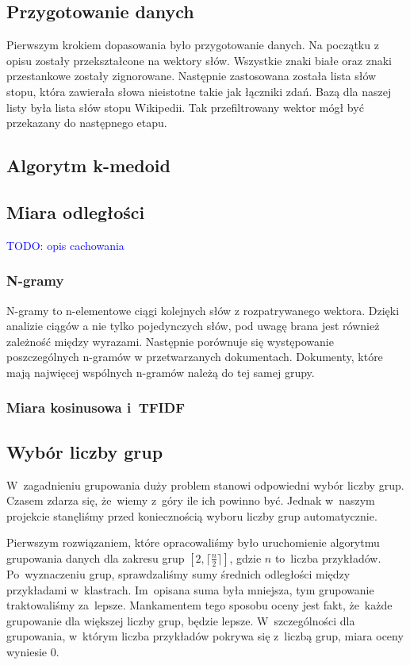 \documentclass[a4paper,12pt]{mwart}
\newcommand{\TODO}[1]{\textcolor{blue}{TODO: #1 \\}}
\begin{document}
\subsection{Przygotowanie danych}
Pierwszym krokiem dopasowania było przygotowanie danych. Na początku z opisu
zostały przekształcone na wektory słów. Wszystkie znaki białe oraz znaki
przestankowe zostały zignorowane. Następnie zastosowana została lista słów stopu,
która zawierała słowa nieistotne takie jak łączniki zdań. Bazą dla naszej listy
była lista słów stopu Wikipedii. Tak przefiltrowany wektor mógł być przekazany
do następnego etapu.

\subsection{Algorytm k-medoid}


\subsection{Miara odległości}
\TODO{opis cachowania}

\subsubsection{N-gramy}
N-gramy to n-elementowe ciągi kolejnych słów z rozpatrywanego wektora. Dzięki
analizie ciągów a nie tylko pojedynczych słów, pod uwagę brana jest również
zależność między wyrazami. Następnie porównuje się występowanie poszczególnych
n-gramów w przetwarzanych dokumentach. Dokumenty, które mają najwięcej wspólnych
n-gramów należą do tej samej grupy.

\subsubsection{Miara kosinusowa i~TFIDF}


\subsection{Wybór liczby grup}

W~zagadnieniu grupowania duży problem stanowi odpowiedni wybór liczby grup.
Czasem zdarza się, że~wiemy z~góry ile ich powinno być. Jednak w~naszym
projekcie stanęliśmy przed koniecznością wyboru liczby grup automatycznie.

Pierwszym rozwiązaniem, które opracowaliśmy było uruchomienie algorytmu
grupowania danych dla zakresu grup $[2, \lceil \frac{n}{2} \rceil]$, gdzie $n$
to~liczba przykładów. Po~wyznaczeniu grup, sprawdzaliśmy sumy średnich
odległości między przykładami w~klastrach. Im~opisana suma była mniejsza, tym
grupowanie traktowaliśmy za~lepsze. Mankamentem tego sposobu oceny jest fakt,
że~każde grupowanie dla większej liczby grup, będzie lepsze. W~szczególności
dla grupowania, w~którym liczba przykładów pokrywa się z~liczbą grup, miara
oceny wyniesie $0$.
\end{document}
